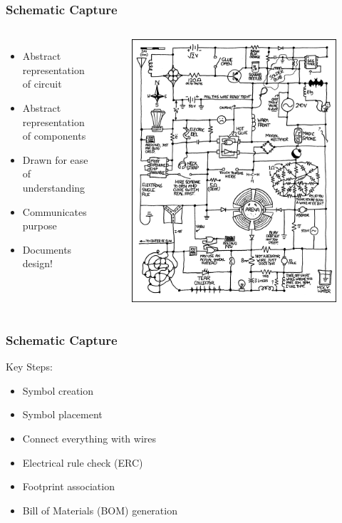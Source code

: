 \documentclass[t]{beamer}
\begin{document}
\begin{frame}
\frametitle{Schematic Capture}
\vspace{-20pt}
\begin{columns}
	\begin{itemize}
		\item Abstract representation of circuit
		\item Abstract representation of components 
		\item Drawn for ease of understanding
		\item Communicates purpose
		\item Documents design!
	\end{itemize}
	
	
	\begin{figure}
		\includegraphics[width=0.8\linewidth]{circuit_diagram.png}
	\end{figure}
\end{columns}
\end{frame}
\begin{frame}
\frametitle{Schematic Capture}
Key Steps:
\begin{itemize}
	\item Symbol creation
	\item Symbol placement
	\item Connect everything with wires
	\item Electrical rule check (ERC)
	\item Footprint association 
	\item Bill of Materials (BOM) generation
\end{itemize}
\end{frame}
\end{document}
